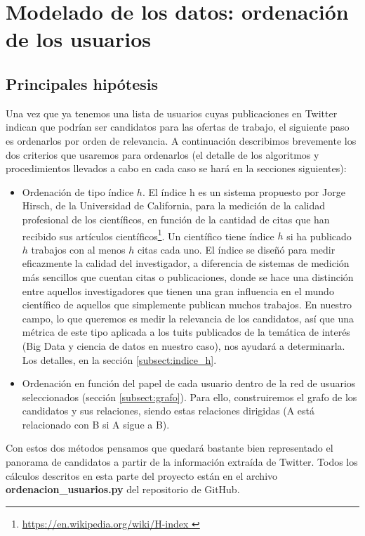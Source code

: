 \chapter{Modelado de los datos: ordenación de los usuarios}
\label{chap:ordenacion_de_usuarios}

\section{Principales hip\'otesis}
Una vez que ya tenemos una lista de usuarios cuyas publicaciones en Twitter
indican que podrían ser candidatos para las ofertas de trabajo, el siguiente
paso es ordenarlos por orden de relevancia. A continuación describimos brevemente
los dos criterios que usaremos para ordenarlos (el detalle de los algoritmos y 
procedimientos llevados a cabo en cada caso se hará en la secciones siguientes):
\begin{itemize}
\item Ordenación de tipo índice $h$. El índice h es un sistema propuesto por Jorge Hirsch, de la Universidad de California, para la medición de la calidad profesional de los científicos, en función de la cantidad de citas que han recibido sus artículos científicos\footnote{\url{https://en.wikipedia.org/wiki/H-index }}. Un científico tiene índice $h$ si ha publicado $h$ trabajos con al menos $h$ citas cada uno. El índice se diseñó para medir eficazmente la calidad del investigador, a diferencia de sistemas de medición más sencillos que cuentan citas o publicaciones, donde se hace una distinción entre aquellos investigadores que tienen una gran influencia en el mundo científico de aquellos que simplemente publican muchos trabajos. En nuestro campo, lo que queremos es medir 
la relevancia de los candidatos, así que una métrica de este tipo aplicada a los tuits publicados
de la temática de interés (Big Data y ciencia de datos en nuestro caso), nos ayudará a determinarla.
Los detalles, en la sección \ref{subsect:indice_h}.

\item Ordenación en función del papel de cada usuario dentro de la red de usuarios
seleccionados (sección \ref{subsect:grafo}). Para ello, construiremos el grafo 
de los candidatos y sus relaciones, siendo estas relaciones dirigidas (A está relacionado
con B si A sigue a B).
\end{itemize}

Con estos dos métodos pensamos que quedará bastante bien representado el panorama
de candidatos a partir de la información extraída de Twitter. 
Todos los cálculos descritos en esta parte del proyecto están en el archivo
{\bf ordenacion\_usuarios.py} del repositorio de GitHub.

